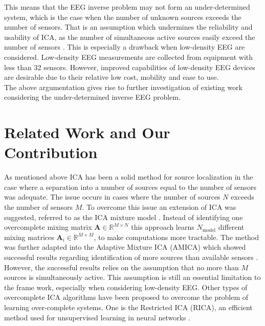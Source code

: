 This means that the EEG inverse problem may not form an under-determined system, which is the case when the number of unknown sources exceeds the number of sensors. 
That is an assumption which undermines the reliability and usability of ICA, as the number of simultaneous active sources easily exceed the number of sensors \cite{phd2015}. 
This is especially a drawback when low-density EEG are considered. Low-density EEG measurements are collected from equipment with less than 32 sensors. 
However, improved capabilities of low-density EEG devices are desirable due to their relative low cost, mobility and ease to use. 
\\
The above argumentation gives rise to further investigation of existing work considering the under-determined inverse EEG problem. 

\section{Related Work and Our Contribution} 
As mentioned above ICA has been a solid method for source localization in the case where a separation into a number of sources equal to the number of sensors was adequate. The issue occurs in cases where the number of sources $N$ exceeds the number of sensors $M$.  
To overcome this issue an extension of ICA was suggested, referred to as the ICA mixture model \cite{Balkan2015}.
Instead of identifying one overcomplete mixing matrix $\mathbf{A} \in \mathbb{R}^{M \times N}$ this approach learns $N_{\text{model}}$ different mixing matrices $\mathbf{A}_i \in \mathbb{R}^{M\times M}$, to make computations more tractable. 
The method was further adapted into the Adaptive Mixture ICA (AMICA) which showed successful results regarding identification of more sources than available sensors \cite{Palmer2008}. 
However, the successful results relies on the assumption that no more than $M$ sources is simultaneously active. This assumption is still an essential limitation to the frame work, especially when considering low-density EEG. 
Other types of overcomplete ICA algorithms have been proposed to overcome the problem of learning over-complete systems. 
One is the Restricted ICA (RICA), an efficient method used for unsupervised learning in neural networks \cite{Le2011}.\\ 

